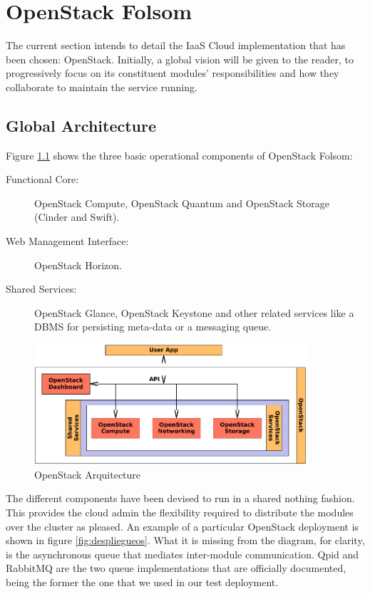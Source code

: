 \chapter{OpenStack Folsom}\label{cap:openstack}
\noindent The current section intends to detail the IaaS Cloud implementation that has been chosen: OpenStack. Initially, a global vision will be given to the reader, to progressively focus on its constituent modules' responsibilities and how they collaborate to maintain the service running.

\section{Global Architecture}\label{sec:arquitecturaglobal}
\noindent Figure \ref{fig:arquitecturaos} shows the three basic operational components of OpenStack Folsom:

\begin{description}
 \item[Functional Core:] OpenStack Compute, OpenStack Quantum and OpenStack Storage (Cinder and Swift).
 \item[Web Management Interface:] OpenStack Horizon.
 \item[Shared Services:] OpenStack Glance, OpenStack Keystone and other related services like a DBMS for persisting meta-data or a messaging queue.
\end{description}

\begin{figure}[tbp]
\begin{center}
\includegraphics[width=0.9\textwidth]{imagenes/012.pdf}
 \caption{OpenStack Arquitecture}
\label{fig:arquitecturaos}
\end{center}
\end{figure}

The different components have been devised to run in a shared nothing fashion. This provides the cloud admin the flexibility required to distribute the modules over the cluster as pleased. An example of a particular OpenStack deployment is shown in figure \ref{fig:despliegueos}. What it is missing from the diagram, for clarity, is the asynchronous queue that mediates inter-module communication. Qpid and RabbitMQ are the two queue implementations that are officially documented, being the former the one that we used in our test deployment.

